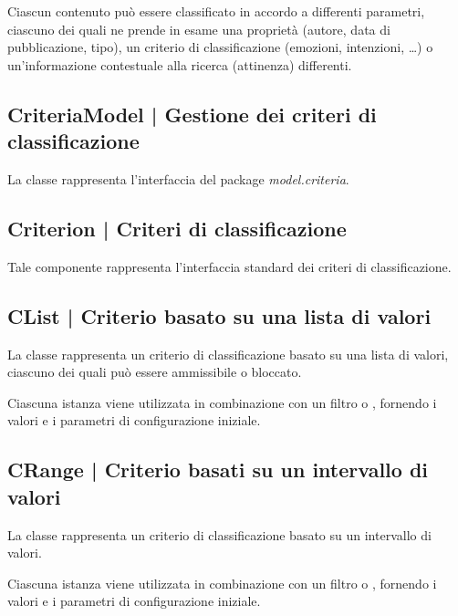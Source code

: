 \documentclass[10pt,a4paper,headinclude,footinclude,hidelinks]{scrreprt} %
\begin{document}
	Ciascun contenuto può essere classificato in accordo a differenti parametri, ciascuno dei quali ne prende in esame una proprietà (autore, data di pubblicazione, tipo), un criterio di classificazione (emozioni, intenzioni, \ldots) o un'informazione contestuale alla ricerca (attinenza) differenti.

	\subsection[CriteriaModel]{CriteriaModel | Gestione dei criteri di classificazione}
	\label{sec:stage:design:model.criteria:criteria-model}
	La classe \textit{} rappresenta l'interfaccia del package \textit{model.criteria}.

	\subsection[Criterion]{Criterion | Criteri di classificazione}
	\label{sec:stage:design:model.criteria:criteria}
	Tale componente rappresenta l'interfaccia standard dei criteri di classificazione.

	\subsection[CList]{CList | Criterio basato su una lista di valori}
	\label{sec:stage:design:model.criteria:list-criterion}
	La classe \textit{} rappresenta un criterio di classificazione basato su una lista di valori, ciascuno dei quali può essere ammissibile o bloccato. 

	Ciascuna istanza viene utilizzata in combinazione con un filtro \textit{} o \textit{}, fornendo i valori e i parametri di configurazione iniziale.

	\subsection[CRange]{CRange | Criterio basati su un intervallo di valori}
	\label{sec:stage:design:model.criteria:range-criterion}
	La classe \textit{} rappresenta un criterio di classificazione basato su un intervallo di valori.

	Ciascuna istanza viene utilizzata in combinazione con un filtro \textit{} o \textit{}, fornendo i valori e i parametri di configurazione iniziale.
\end{document}
